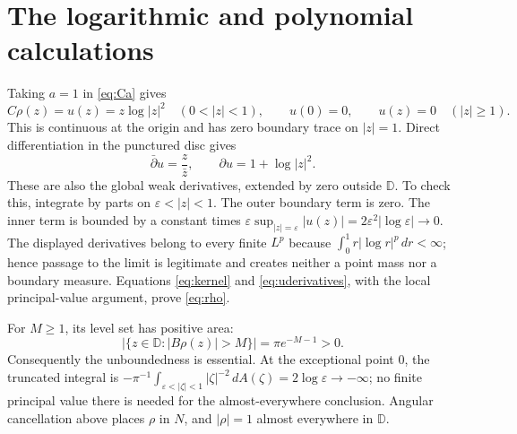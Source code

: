 \documentclass[10pt]{article}
\newcommand{\D}{\mathbb D}
\newcommand{\dd}{\,dA}
\newcommand{\dbar}{\bar\partial}
\begin{document}
\section{The logarithmic and polynomial calculations}
Taking $a=1$ in \eqref{eq:Ca} gives
\[
 C\rho(z)=u(z)=z\log|z|^2\quad(0<|z|<1),
 \qquad u(0)=0,\qquad u(z)=0\quad(|z|\ge1).
\]
This is continuous at the origin and has zero boundary trace on
$|z|=1$. Direct differentiation in the punctured disc gives
\begin{equation}\label{eq:uderivatives}
 \dbar u=\frac z{\bar z},\qquad \partial u=1+\log|z|^2.
\end{equation}
These are also the global weak derivatives, extended by zero outside
$\D$. To check this, integrate by parts on
$\varepsilon<|z|<1$. The outer boundary term is zero. The inner term
is bounded by a constant times
$\varepsilon\sup_{|z|=\varepsilon}|u(z)|
 =2\varepsilon^2|\log\varepsilon|\to0$.
The displayed derivatives belong to every finite $L^p$ because
$\int_0^1 r|\log r|^p\,dr<\infty$; hence passage to the limit is
legitimate and creates neither a point mass nor a boundary measure.
Equations \eqref{eq:kernel} and \eqref{eq:uderivatives}, with the local
principal-value argument, prove \eqref{eq:rho}.

For $M\ge1$, its level set has positive area:
\begin{equation}\label{eq:level}
 \bigl|\{z\in\D:|B\rho(z)|>M\}\bigr|=\pi e^{-M-1}>0.
\end{equation}
Consequently the unboundedness is essential. At the exceptional point
$0$, the truncated integral is
$-\pi^{-1}\int_{\varepsilon<|\zeta|<1}|\zeta|^{-2}\dd(\zeta)
 =2\log\varepsilon\to-\infty$; no finite principal value there is
needed for the almost-everywhere conclusion. Angular cancellation above
places $\rho$ in $N$, and $|\rho|=1$ almost everywhere in $\D$.
\end{document}
